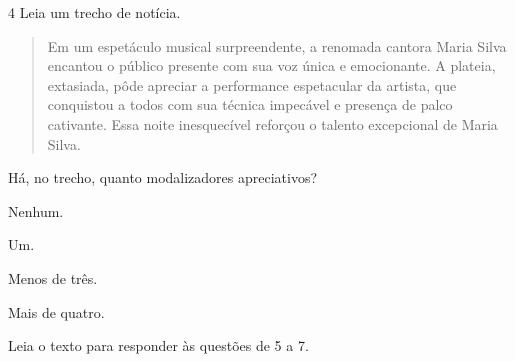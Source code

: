 \num{4} Leia um trecho de notícia.


\begin{quote}
Em um espetáculo musical surpreendente, a renomada cantora Maria Silva
encantou o público presente com sua voz única e emocionante. A plateia,
extasiada, pôde apreciar a performance espetacular da artista, que
conquistou a todos com sua técnica impecável e presença de palco
cativante. Essa noite inesquecível reforçou o talento excepcional de
Maria Silva.
\end{quote}

Há, no trecho, quanto modalizadores apreciativos?

\begin{escolha}
\item
  Nenhum.
\item
  Um.
\item
  Menos de três.
\item
  Mais de quatro.
\end{escolha}

\pagebreak
Leia o texto para responder às questões de 5 a 7.

